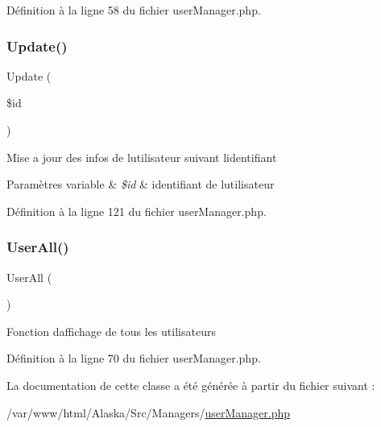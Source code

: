 Définition à la ligne 58 du fichier user\+Manager.\+php.

\mbox{\label{class_src_1_1_managers_1_1user_manager_a82232b33fbfacdbdb8a8f49acaecf564}} 
\subsubsection{\texorpdfstring{Update()}{Update()}}
{\footnotesize\ttfamily Update (\begin{DoxyParamCaption}\item[{}]{\$id }\end{DoxyParamCaption})}

Mise a jour des infos de l\textquotesingle{}utilisateur suivant l\textquotesingle{}identifiant 
\begin{DoxyParams}[1]{Paramètres}
variable & {\em \$id} & identifiant de l\textquotesingle{}utilisateur \\
\hline
\end{DoxyParams}


Définition à la ligne 121 du fichier user\+Manager.\+php.

\mbox{\label{class_src_1_1_managers_1_1user_manager_a0a377befd1052a5f989fd915af31373b}} 
\subsubsection{\texorpdfstring{User\+All()}{UserAll()}}
{\footnotesize\ttfamily User\+All (\begin{DoxyParamCaption}{ }\end{DoxyParamCaption})}

Fonction d\textquotesingle{}affichage de tous les utilisateurs 

Définition à la ligne 70 du fichier user\+Manager.\+php.



La documentation de cette classe a été générée à partir du fichier suivant \+:\begin{DoxyCompactItemize}
\item 
/var/www/html/\+Alaska/\+Src/\+Managers/\hyperlink{user_manager_8php}{user\+Manager.\+php}\end{DoxyCompactItemize}
